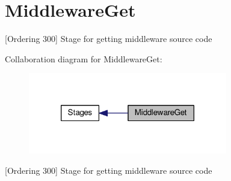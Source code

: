 \hypertarget{group___middleware_get}{\section{Middleware\-Get}
\label{group___middleware_get}
}


\mbox{[}Ordering 300\mbox{]} Stage for getting middleware source code  


Collaboration diagram for Middleware\-Get\-:
\nopagebreak
\begin{figure}[H]
\begin{center}
\leavevmode
\includegraphics[width=246pt]{group___middleware_get}
\end{center}
\end{figure}
\mbox{[}Ordering 300\mbox{]} Stage for getting middleware source code 